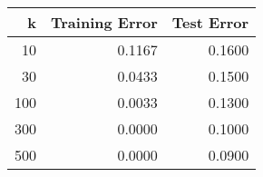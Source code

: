 \begin{tabular}{rrr}
\toprule
k & Training Error & Test Error \\
\midrule
10 & 0.1167 & 0.1600 \\
30 & 0.0433 & 0.1500 \\
100 & 0.0033 & 0.1300 \\
300 & 0.0000 & 0.1000 \\
500 & 0.0000 & 0.0900 \\
\bottomrule
\end{tabular}
